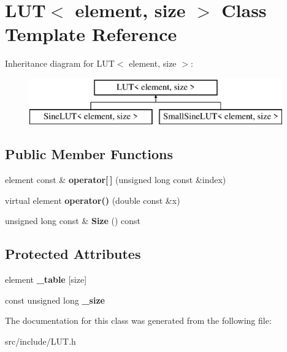 \hypertarget{class_l_u_t}{\section{L\+U\+T$<$ element, size $>$ Class Template Reference}
\label{class_l_u_t}
}
Inheritance diagram for L\+U\+T$<$ element, size $>$\+:\begin{figure}[H]
\begin{center}
\leavevmode
\includegraphics[height=2.000000cm]{class_l_u_t}
\end{center}
\end{figure}
\subsection*{Public Member Functions}
\begin{DoxyCompactItemize}
\item 
\hypertarget{class_l_u_t_a465872a9905524380054272c6d9abb79}{element const \& {\bfseries operator\mbox{[}$\,$\mbox{]}} (unsigned long const \&index)}\label{class_l_u_t_a465872a9905524380054272c6d9abb79}

\item 
\hypertarget{class_l_u_t_aaae83a93b13baa1a7a440aa6975ec6f4}{virtual element {\bfseries operator()} (double const \&x)}\label{class_l_u_t_aaae83a93b13baa1a7a440aa6975ec6f4}

\item 
\hypertarget{class_l_u_t_ad18e194a842866b51b15ebead5868b04}{unsigned long const \& {\bfseries Size} () const }\label{class_l_u_t_ad18e194a842866b51b15ebead5868b04}

\end{DoxyCompactItemize}
\subsection*{Protected Attributes}
\begin{DoxyCompactItemize}
\item 
\hypertarget{class_l_u_t_a7b71619c655089bccaa90c7e86535ad8}{element {\bfseries \+\_\+table} \mbox{[}size\mbox{]}}\label{class_l_u_t_a7b71619c655089bccaa90c7e86535ad8}

\item 
\hypertarget{class_l_u_t_a67094d8cb71d3799d6ac14d07fde0372}{const unsigned long {\bfseries \+\_\+size}}\label{class_l_u_t_a67094d8cb71d3799d6ac14d07fde0372}

\end{DoxyCompactItemize}


The documentation for this class was generated from the following file\+:\begin{DoxyCompactItemize}
\item 
src/include/L\+U\+T.\+h\end{DoxyCompactItemize}
